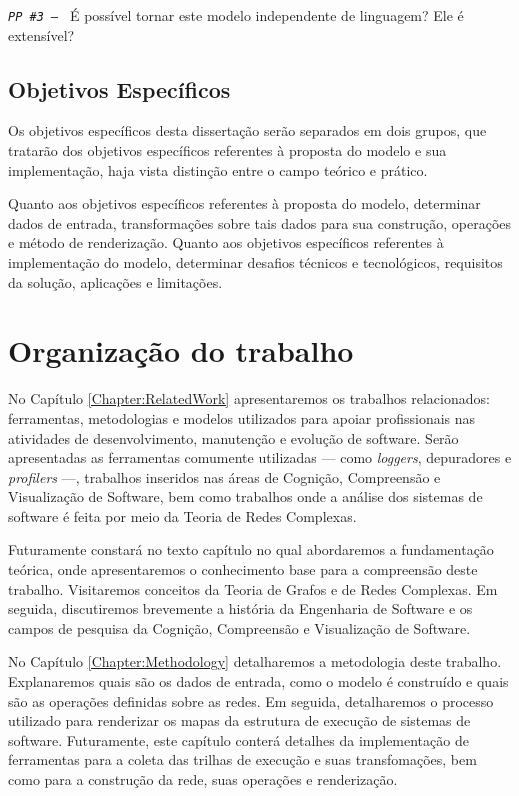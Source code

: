 \noindent
\texttt{\textit{PP \#3 -- }}
É possível tornar este modelo independente de linguagem? Ele é extensível?

\subsection{Objetivos Específicos}
\label{subsec:ObjetivosEspecíficos}

Os objetivos específicos desta dissertação serão separados em dois grupos, que
tratarão dos objetivos específicos referentes à proposta do modelo e sua
implementação, haja vista distinção entre o campo teórico e prático.

Quanto aos objetivos específicos referentes à proposta do modelo, determinar
dados de entrada, transformações sobre tais dados para sua construção, operações
e método de renderização.
Quanto aos objetivos específicos referentes à implementação do modelo,
determinar desafios técnicos e tecnológicos, requisitos da solução, aplicações e
limitações.

\section{Organização do trabalho}
\label{sec:OrganizaçãoTrabalho}

No Capítulo \ref{Chapter:RelatedWork} apresentaremos os trabalhos
relacionados: ferramentas, metodologias e modelos utilizados para apoiar
profissionais nas atividades de  desenvolvimento, manutenção e evolução de
software.
Serão apresentadas as ferramentas comumente utilizadas --- como
\textit{loggers}, depuradores e \textit{profilers} ---, trabalhos inseridos nas
áreas de Cognição, Compreensão e Visualização de Software, bem como trabalhos
onde a análise dos sistemas de software é feita por meio da Teoria de Redes
Complexas.

Futuramente constará no texto capítulo no qual abordaremos a fundamentação
teórica, onde apresentaremos o conhecimento base para a compreensão deste
trabalho.
Visitaremos conceitos da Teoria de Grafos e de Redes Complexas.
Em seguida, discutiremos brevemente a história da Engenharia de Software e
os campos de pesquisa da Cognição, Compreensão e Visualização de Software.

No Capítulo \ref{Chapter:Methodology} detalharemos a metodologia deste trabalho.
Explanaremos quais são os dados de entrada, como o modelo é construído e quais
são as operações definidas sobre as redes.
Em seguida, detalharemos o processo utilizado para renderizar os mapas da
estrutura de execução de sistemas de software.
Futuramente, este capítulo conterá detalhes da implementação de ferramentas para
a coleta das trilhas de execução e suas transfomações, bem como para a
construção da rede, suas operações e renderização.

